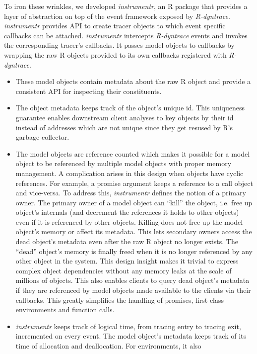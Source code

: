 \documentclass[screen,acmsmall]{acmart}
\begin{document}
To iron these wrinkles, we developed \emph{instrumentr}, an R package that
provides a layer of abstraction on top of the event framework exposed by
\emph{R-dyntrace}. \emph{instrumentr} provides API to create tracer objects to
which event specific callbacks can be attached. \emph{instrumentr} intercepts
\emph{R-dyntrace} events and invokes the corresponding tracer's callbacks. It
passes model objects to callbacks by wrapping the raw R objects provided to
its own callbacks registered with \emph{R-dyntrace}.
\begin{itemize}
\item These model objects contain metadata about the raw R object and provide a
  consistent API for inspecting their constituents.
\item The object metadata keeps track of the object's unique id. This uniqueness
  guarantee enables downstream client analyses to key objects by their id
  instead of addresses which are not unique since they get resused by R's
  garbage collector.
\item The model objects are reference counted which makes it possible for a
  model object to be referenced by multiple model objects with proper memory
  management. A complication arises in this design when objects have cyclic
  references. For example, a promise argument keeps a reference to a call object
  and vice-versa. To address this, \emph{instrumentr} defines the notion of a
  primary owner. The primary owner of a model object can ``kill'' the object,
  i.e. free up object's internals (and decrement the references it holds to
  other objects) even if it is referenced by other objects. Killing does not
  free up the model object's memory or affect its metadata. This lets secondary
  owners access the dead object's metadata even after the raw R object no longer
  exists. The ``dead'' object's memory is finally freed when it is no longer
  referenced by any other object in the system. This design insight makes it
  trivial to express complex object dependencies without any memory leaks at the
  scale of millions of objects. This also enables clients to query dead object's
  metadata if they are referenced by model objects made available to the clients
  via their callbacks. This greatly simplifies the handling of promises, first
  class environments and function calls.
\item \emph{instrumentr} keeps track of logical time, from tracing entry to
tracing exit, incremented on every event. The model object's metadata keeps
track of its time of allocation and deallocation. For environments, it also

\end{itemize}
\end{document}
